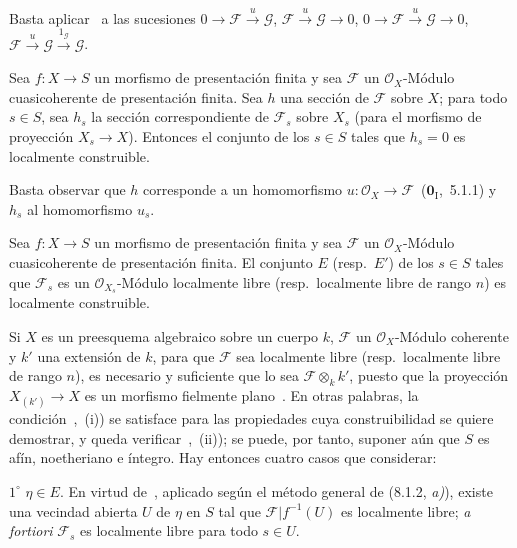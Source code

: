Basta aplicar~ a las sucesiones $0\to\mathcal F\xrightarrow{u}\mathcal G$, $\mathcal F\xrightarrow{u}\mathcal G\to0$, $0\to\mathcal F\xrightarrow{u}\mathcal G\to0$, $\mathcal F\xrightarrow{u}\mathcal G\xrightarrow{1_\mathcal G}\mathcal G$.

\begin{corollary}[9.4.6]
\label{IV.9.4.6}
Sea $f:X\to S$ un morfismo de presentación finita y sea $\mathcal F$ un $\mathcal O_X$-Módulo cuasicoherente de presentación finita.
Sea $h$ una sección de $\mathcal F$ sobre $X$; para todo $s\in S$, sea $h_s$ la sección correspondiente de $\mathcal F_s$ sobre $X_s$ \textnormal{(}para el morfismo de proyección $X_s\to X$\textnormal{)}.
Entonces el conjunto de los $s\in S$ tales que $h_s=0$ es localmente construible.
\end{corollary}

Basta observar que $h$ corresponde a un homomorfismo $u:\mathcal O_X\to\mathcal F$~($\mathbf{0}_{\mathrm{I}}$,~5.1.1) y $h_s$ al homomorfismo $u_s$.

\begin{proposition}[9.4.7]
\label{IV.9.4.7}
Sea $f:X\to S$ un morfismo de presentación finita y sea $\mathcal F$ un $\mathcal O_X$-Módulo cuasicoherente de presentación finita.
El conjunto $E$ \textnormal{(resp.}\ $E'$\textnormal{)} de los $s\in S$ tales que $\mathcal F_s$ es un $\mathcal O_{X_s}$-Módulo localmente libre \textnormal{(resp.}\ localmente libre de rango $n$\textnormal{)} es localmente construible.
\end{proposition}

Si $X$ es un preesquema algebraico sobre un cuerpo $k$, $\mathcal F$ un $\mathcal O_X$-Módulo coherente y $k'$ una extensión de $k$, para que $\mathcal F$ sea localmente libre (resp.\ localmente libre de rango $n$), es necesario y suficiente que lo sea $\mathcal F\otimes_k k'$, puesto que la proyección $X_{(k')}\to X$ es un morfismo fielmente plano~.
En otras palabras, la condición~,~(i)) se satisface para las propiedades cuya construibilidad se quiere demostrar, y queda verificar~,~(ii)); se puede, por tanto, suponer aún que $S$ es afín, noetheriano e íntegro.
Hay entonces cuatro casos que considerar:

$1^\circ$ $\eta\in E$.
En virtud de~, aplicado según el método general de (8.1.2, \emph{a)}), existe una vecindad abierta $U$ de $\eta$ en $S$ tal que $\mathcal F|f^{-1}(U)$ es localmente libre; \emph{a fortiori} $\mathcal F_s$ es localmente libre para todo $s\in U$.

